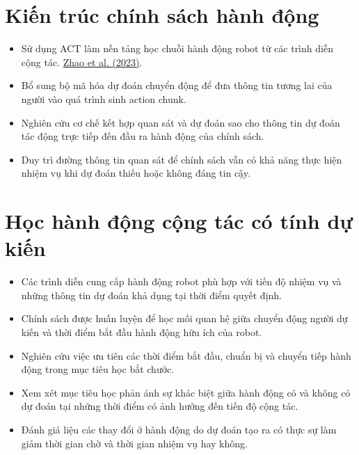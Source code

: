 \section{Kiến trúc chính sách hành động}

\begin{itemize}
    \item Sử dụng ACT làm nền tảng học chuỗi hành động robot từ các trình diễn cộng tác.
    \href{https://roboticsproceedings.org/rss19/p016.html}{Zhao et al. (2023)}.

    \item Bổ sung bộ mã hóa dự đoán chuyển động để đưa thông tin tương lai của người vào quá trình sinh action chunk.

    \item Nghiên cứu cơ chế kết hợp quan sát và dự đoán sao cho thông tin dự đoán tác động trực tiếp đến đầu ra hành động của chính sách.

    \item Duy trì đường thông tin quan sát để chính sách vẫn có khả năng thực hiện nhiệm vụ khi dự đoán thiếu hoặc không đáng tin cậy.
\end{itemize}


\section{Học hành động cộng tác có tính dự kiến}

\begin{itemize}
    \item Các trình diễn cung cấp hành động robot phù hợp với tiến độ nhiệm vụ và những thông tin dự đoán khả dụng tại thời điểm quyết định.

    \item Chính sách được huấn luyện để học mối quan hệ giữa chuyển động người dự kiến và thời điểm bắt đầu hành động hữu ích của robot.

    \item Nghiên cứu việc ưu tiên các thời điểm bắt đầu, chuẩn bị và chuyển tiếp hành động trong mục tiêu học bắt chước.

    \item Xem xét mục tiêu học phản ánh sự khác biệt giữa hành động có và không có dự đoán tại những thời điểm có ảnh hưởng đến tiến độ cộng tác.

    \item Đánh giá liệu các thay đổi ở hành động do dự đoán tạo ra có thực sự làm giảm thời gian chờ và thời gian nhiệm vụ hay không.
\end{itemize}


